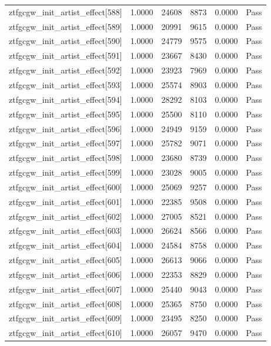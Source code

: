 \begin{table}[htbp]
\begin{tabular}{llrrll}
ztfgcgw\_init\_artist\_effect[588] & 1.0000 & 24608 & 8873 & 0.0000 & Pass \\
ztfgcgw\_init\_artist\_effect[589] & 1.0000 & 20991 & 9615 & 0.0000 & Pass \\
ztfgcgw\_init\_artist\_effect[590] & 1.0000 & 24779 & 9575 & 0.0000 & Pass \\
ztfgcgw\_init\_artist\_effect[591] & 1.0000 & 23667 & 8430 & 0.0000 & Pass \\
ztfgcgw\_init\_artist\_effect[592] & 1.0000 & 23923 & 7969 & 0.0000 & Pass \\
ztfgcgw\_init\_artist\_effect[593] & 1.0000 & 25574 & 8903 & 0.0000 & Pass \\
ztfgcgw\_init\_artist\_effect[594] & 1.0000 & 28292 & 8103 & 0.0000 & Pass \\
ztfgcgw\_init\_artist\_effect[595] & 1.0000 & 25500 & 8110 & 0.0000 & Pass \\
ztfgcgw\_init\_artist\_effect[596] & 1.0000 & 24949 & 9159 & 0.0000 & Pass \\
ztfgcgw\_init\_artist\_effect[597] & 1.0000 & 25782 & 9071 & 0.0000 & Pass \\
ztfgcgw\_init\_artist\_effect[598] & 1.0000 & 23680 & 8739 & 0.0000 & Pass \\
ztfgcgw\_init\_artist\_effect[599] & 1.0000 & 23028 & 9005 & 0.0000 & Pass \\
ztfgcgw\_init\_artist\_effect[600] & 1.0000 & 25069 & 9257 & 0.0000 & Pass \\
ztfgcgw\_init\_artist\_effect[601] & 1.0000 & 22385 & 9508 & 0.0000 & Pass \\
ztfgcgw\_init\_artist\_effect[602] & 1.0000 & 27005 & 8521 & 0.0000 & Pass \\
ztfgcgw\_init\_artist\_effect[603] & 1.0000 & 26624 & 8566 & 0.0000 & Pass \\
ztfgcgw\_init\_artist\_effect[604] & 1.0000 & 24584 & 8758 & 0.0000 & Pass \\
ztfgcgw\_init\_artist\_effect[605] & 1.0000 & 26613 & 9066 & 0.0000 & Pass \\
ztfgcgw\_init\_artist\_effect[606] & 1.0000 & 22353 & 8829 & 0.0000 & Pass \\
ztfgcgw\_init\_artist\_effect[607] & 1.0000 & 25440 & 9043 & 0.0000 & Pass \\
ztfgcgw\_init\_artist\_effect[608] & 1.0000 & 25365 & 8750 & 0.0000 & Pass \\
ztfgcgw\_init\_artist\_effect[609] & 1.0000 & 23495 & 8250 & 0.0000 & Pass \\
ztfgcgw\_init\_artist\_effect[610] & 1.0000 & 26057 & 9470 & 0.0000 & Pass \\

\end{tabular}
\end{table}
